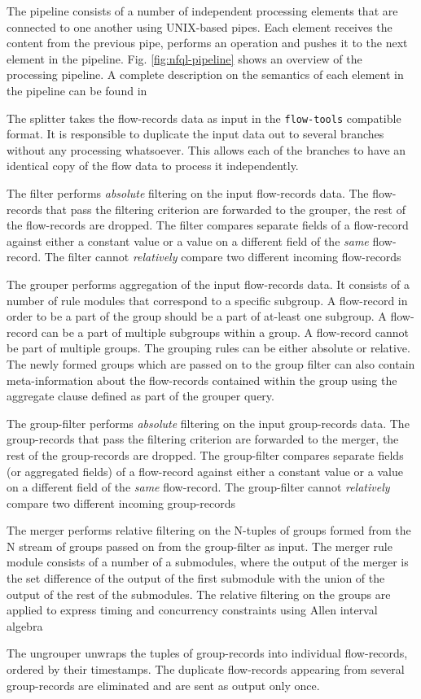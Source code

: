 The pipeline consists of a number of independent processing elements that are
connected to one another using UNIX-based pipes. Each element receives the
content from the previous pipe, performs an operation and pushes it to the
next element in the pipeline. Fig. \ref{fig:nfql-pipeline} shows an
overview of the processing pipeline. A complete description on the semantics
of each element in the pipeline can be found in \cite{vmarinov:2009}

The splitter takes the flow-records data as input in the \texttt{flow-tools}
compatible format. It is responsible to duplicate the input data out to
several branches without any processing whatsoever. This
allows each of the branches to have an identical copy of the flow data to
process it independently.

The filter performs \emph{absolute} filtering on the input flow-records data.
The flow-records that pass the filtering criterion are forwarded to the
grouper, the rest of the flow-records are dropped. The
filter compares separate fields of a flow-record against either a constant
value or a value on a different field of the \emph{same} flow-record. The
filter cannot \emph{relatively} compare two different incoming flow-records

The grouper performs aggregation of the input flow-records data. It consists
of a number of rule modules that correspond to a specific subgroup. A
flow-record in order to be a part of the group should be a part of at-least
one subgroup. A flow-record can be a part of multiple subgroups within a
group. A flow-record cannot be part of multiple groups.
The grouping rules can be either absolute or relative. The newly formed groups
which are passed on to the group filter can also contain meta-information
about the flow-records contained within the group using the aggregate clause
defined as part of the grouper query.

The group-filter performs \emph{absolute} filtering on the input group-records
data. The group-records that pass the filtering criterion are forwarded to the
merger, the rest of the group-records are dropped. The group-filter compares
separate fields (or aggregated fields) of a
flow-record against either a constant value or a value on a different field of
the \emph{same} flow-record. The group-filter cannot \emph{relatively} compare
two different incoming group-records

The merger performs relative filtering on the N-tuples of groups formed from
the N stream of groups passed on from the group-filter as input. The merger
rule module consists of a number of a submodules, where the output of the
merger is the set difference of the output of the first
submodule with the union of the output of the rest of the submodules. The
relative filtering on the groups are applied to express timing and concurrency
constraints using Allen interval algebra \cite{fallen:1983}

The ungrouper unwraps the tuples of group-records into individual
flow-records, ordered by their timestamps. The duplicate
flow-records appearing from several group-records are eliminated and are sent
as output only once.


